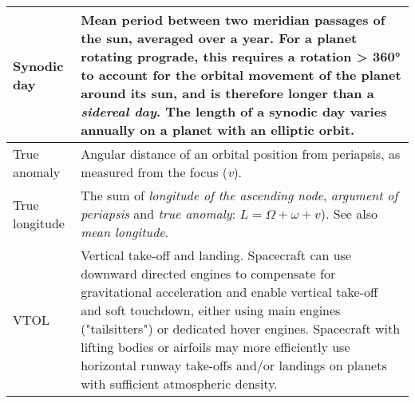 \documentclass[Orbiter User Manual.tex]{subfiles}
\begin{document}
\begin{longtable}{ |p{}|p{}| }
	\hline\rule{0pt}{2ex}
	Synodic day & Mean period between two meridian passages of the sun, averaged over a year. For a planet rotating prograde, this requires a rotation > 360° to account for the orbital movement of the planet around its sun, and is therefore longer than a \textit{sidereal day}. The length of a synodic day varies annually on a planet with an elliptic orbit.\\
	\hline\rule{0pt}{2ex}
	True anomaly & Angular distance of an orbital position from periapsis, as measured from the focus (\textit{v}).\\
	\hline\rule{0pt}{2ex}
	True longitude & The sum of \textit{longitude of the ascending node}, \textit{argument of periapsis} and \textit{true anomaly}: $L = \Omega + \omega + v$). See also \textit{mean longitude}.\\
	\hline\rule{0pt}{2ex}
	VTOL & Vertical take-off and landing. Spacecraft can use downward directed engines to compensate for gravitational acceleration and enable vertical take-off and soft touchdown, either using main engines ("tailsitters") or dedicated hover engines. Spacecraft with lifting bodies or airfoils may more efficiently use horizontal runway take-offs and/or landings on planets with sufficient atmospheric density.\\
	\hline
	\end{longtable}
\end{document}
